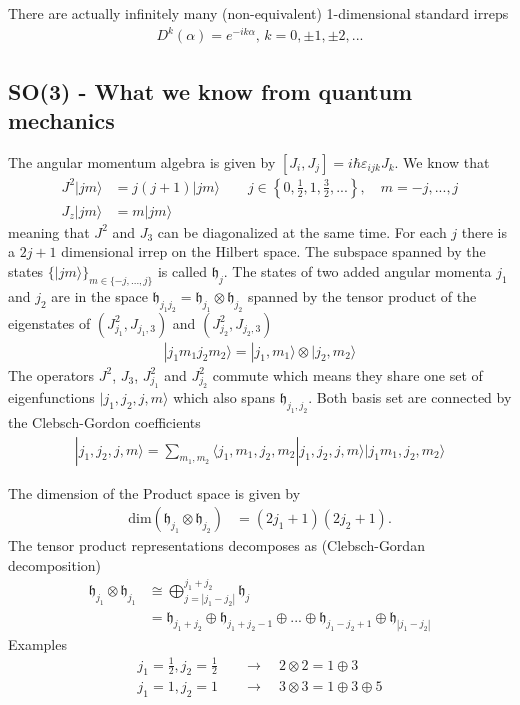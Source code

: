 \documentclass[../main.tex]{subfiles}
\begin{document}
There are actually infinitely many (non-equivalent) 1-dimensional standard irreps
\begin{align}
    D^{k}(\alpha)=e^{-ik\alpha},\,k=0,\pm1,\pm2,...
\end{align}

\subsection{SO(3) - What we know from quantum mechanics}
The angular momentum algebra is given by $[J_i,J_j]=i\hbar\varepsilon_{ijk}J_k$. We know that
\begin{align}
J^2|jm\rangle&=j(j+1)|jm\rangle\qquad j\in\left\{0,\frac{1}{2},1,\frac{3}{2},...\right\},\quad m=-j,...,j\\
J_z|jm\rangle&=m|jm\rangle
\end{align}
meaning that $J^2$ and $J_3$ can be diagonalized at the same time. For each $j$ there is a $2j+1$ dimensional 
irrep on the Hilbert space. The subspace spanned by the states $\{|jm\rangle\}_{m\in\{-j,...,j\}}$ 
is called $\mathfrak{h}_j$. The states of 
two added angular momenta $j_1$ and $j_2$ are in the space $\mathfrak{h}_{j_1j_2}=\mathfrak{h}_{j_1}\otimes\mathfrak{h}_{j_2}$ spanned by the tensor product of the eigenstates of $(J_{j_1}^2,J_{j_1,3})$ and $(J_{j_2}^2,J_{j_2,3})$
\begin{align}
|j_1m_1j_2m_2\rangle=|j_1,m_1\rangle\otimes|j_2,m_2\rangle
\end{align}
The operators $J^2$, $J_3$, $J_{j_1}^2$ and $J_{j_2}^2$ commute which means they share one set of eigenfunctions $|j_1,j_2,j,m\rangle$ which also spans $\mathfrak{h}_{j_1,j_2}$. Both basis set are connected by the Clebsch-Gordon coefficients
\begin{align}
|j_1,j_2,j,m\rangle=\sum_{m_1,m_2}\langle j_1,m_1,j_2,m_2|j_1,j_2,j,m\rangle|j_1m_1,j_2,m_2\rangle
\end{align}

The dimension of the Product space is given by
\begin{align}
\text{dim}(\mathfrak{h}_{j_1} \otimes \mathfrak{h}_{j_2})&=(2j_1+1)(2j_2+1).
\end{align}
The tensor product representations decomposes as ({\sc Clebsch-Gordan} decomposition)
\begin{align}
    \mathfrak{h}_{j_1} \otimes \mathfrak{h}_{j_1} &\cong \bigoplus_{j=|j_1-j_2|}^{j_1+j_2} \mathfrak{h}_{j}\\
    &=\mathfrak{h}_{j_1+j_2}\oplus \mathfrak{h}_{j_1+j_2-1}\oplus ... \oplus \mathfrak{h}_{j_1-j_2+1}\oplus \mathfrak{h}_{|j_1-j_2|}
\end{align}
Examples
\begin{align}
j_1=\frac{1}{2}, j_2=\frac{1}{2}&\quad\rightarrow\quad 2\otimes2=1\oplus3\\
j_1=1, j_2=1&\quad\rightarrow\quad 3\otimes3=1\oplus3\oplus5
\end{align}
\end{document}
